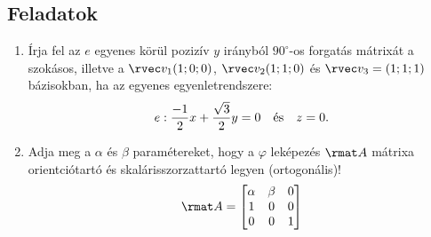 \documentclass[a4paper, 12pt]{scrartcl}
\begin{document}
\subsection{Feladatok}
\begin{enumerate}
  \item Írja fel az $e$ egyenes körül pozizív $y$ irányból $90^\circ$-os
        forgatás mátrixát a szokásos, illetve a $\rvec v_1(1; 0; 0)$,
        $\rvec v_2(1; 1; 0)$ és $\rvec v_3 = (1; 1; 1)$ bázisokban, ha az
        egyenes egyenletrendszere:
        $$
          e:
          \frac{-1}{2} x + \frac{\sqrt{3}}{2} y = 0
          \quad \text{és} \quad
          z = 0
          \text.
        $$

  \item Adja meg a $\alpha$ és $\beta$ paramétereket, hogy a $\varphi$ leképezés
        $\rmat A$ mátrixa orientciótartó és skalárisszorzattartó legyen
        (ortogonális)!
        $$
          \rmat A = \begin{bmatrix}
            \alpha & \beta & 0 \\
            1      & 0     & 0 \\
            0      & 0     & 1
          \end{bmatrix}
        $$


\end{enumerate}
\end{document}
